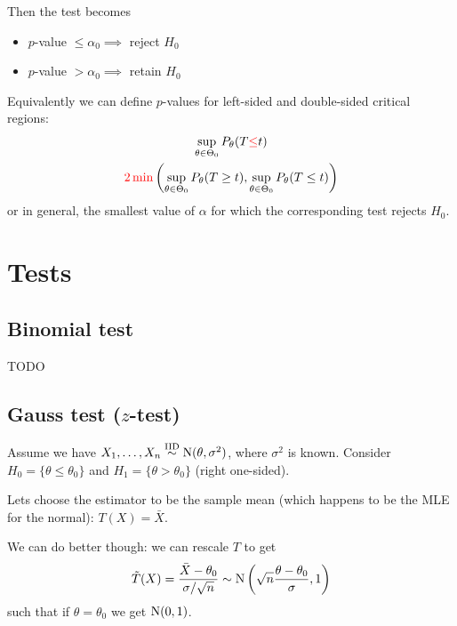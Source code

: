 \documentclass[12pt]{extarticle}
\newcommand{\Normal}{{\operatorfont N}}
\begin{document}
Then the test becomes
\begin{itemize}
    \item $p$-value $\leq \alpha_0 \implies$ reject $H_0$
    \item $p$-value $> \alpha_0 \implies$ retain $H_0$
\end{itemize}

Equivalently we can define $p$-values for left-sided and double-sided critical regions:
\begin{gather}
    \sup_{\theta \in \Theta_0} P_\theta (T {\color{red} \leq} t)\\
    {\color{red} 2 \min }\left( \sup_{\theta \in \Theta_0} P_\theta (T \geq t), \sup_{\theta \in \Theta_0} P_\theta (T \leq t) \right)
\end{gather}
or in general, the smallest value of $\alpha$ for which the corresponding test rejects $H_0$.

\section{Tests}

\subsection{Binomial test}

TODO

\subsection{Gauss test (\texorpdfstring{$z$}{z}-test)}

Assume we have $X_1, \dots, X_n \stackrel{\text{IID}}{\sim} \Normal(\theta, \sigma^2)$, where $\sigma^2$ is known.
Consider $H_0 = \{ \theta \leq \theta_0 \}$ and $H_1 = \{ \theta \gt \theta_0 \}$ (right one-sided).

Lets choose the estimator to be the sample mean (which happens to be the MLE for the normal): $T(X) = \bar X$.

We can do better though: we can rescale $T$ to get
\begin{equation}
    \tilde{T}(X) = \frac{\bar X - \theta_0}{\sigma /\sqrt{n}} \sim \Normal\left(\sqrt{n} \frac{\theta - \theta_0}{\sigma}, 1\right)
\end{equation}
such that if $\theta = \theta_0$ we get $\Normal(0,1)$.
\end{document}
